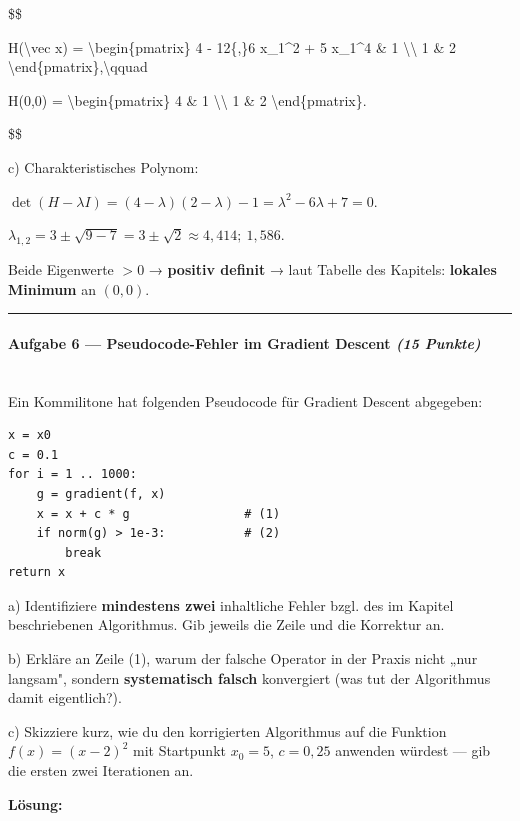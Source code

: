 \documentclass[11pt, a4paper]{article}
\begin{document}
\$\$

H(\textbackslash{}vec x) = \textbackslash{}begin\{pmatrix\} 4 - 12\{,\}6 x\_1\textasciicircum{}2 + 5 x\_1\textasciicircum{}4 \& 1 \textbackslash{}\textbackslash{} 1 \& 2 \textbackslash{}end\{pmatrix\},\textbackslash{}qquad

H(0,0) = \textbackslash{}begin\{pmatrix\} 4 \& 1 \textbackslash{}\textbackslash{} 1 \& 2 \textbackslash{}end\{pmatrix\}.

\$\$


c) Charakteristisches Polynom:

$\det(H - \lambda I) = (4-\lambda)(2-\lambda) - 1 = \lambda^2 - 6\lambda + 7 = 0.$

$\lambda_{1,2} = 3 \pm \sqrt{9-7} = 3 \pm \sqrt{2} \approx 4{,}414;\ 1{,}586.$


Beide Eigenwerte $> 0$ → \textbf{positiv definit} → laut Tabelle des Kapitels: \textbf{lokales Minimum} an $(0,0)$.



\noindent\textcolor{rulegray}{\rule{\linewidth}{0.4pt}}


\paragraph{Aufgabe 6 — Pseudocode-Fehler im Gradient Descent \textit{(15 Punkte)}}\mbox{}\\[2pt]

Ein Kommilitone hat folgenden Pseudocode für Gradient Descent abgegeben:


\begin{lstlisting}
x = x0
c = 0.1
for i = 1 .. 1000:
    g = gradient(f, x)
    x = x + c * g                # (1)
    if norm(g) > 1e-3:           # (2)
        break
return x
\end{lstlisting}


a) Identifiziere \textbf{mindestens zwei} inhaltliche Fehler bzgl. des im Kapitel beschriebenen Algorithmus. Gib jeweils die Zeile und die Korrektur an.


b) Erkläre an Zeile (1), warum der falsche Operator in der Praxis nicht „nur langsam", sondern \textbf{systematisch falsch} konvergiert (was tut der Algorithmus damit eigentlich?).


c) Skizziere kurz, wie du den korrigierten Algorithmus auf die Funktion $f(x) = (x-2)^2$ mit Startpunkt $x_0 = 5$, $c = 0{,}25$ anwenden würdest — gib die ersten zwei Iterationen an.


\textbf{Lösung:}
\end{document}
